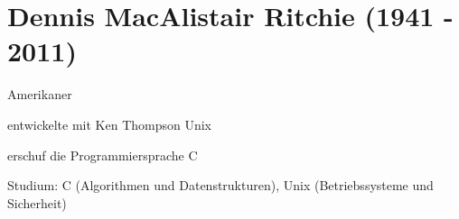\documentclass[a4paper,12pt]{report}
\begin{document}
\section*{Dennis MacAlistair Ritchie (1941 - 2011)}
\begin{itemize*}
    \item Amerikaner
    \item entwickelte mit Ken Thompson Unix
    \item erschuf die Programmiersprache C
    \item Studium: C (Algorithmen und Datenstrukturen), Unix (Betriebssysteme und Sicherheit)
\end{itemize*}



\end{document}
